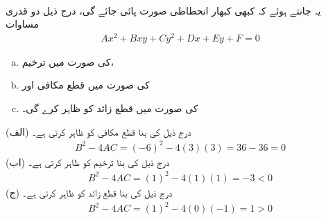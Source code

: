 \\
یہ جانتے ہوئے کہ کبھی کبھار انحطاطی صورت پائی جائے گی، درج ذیل دو قدری مساوات 
\begin{align*}
Ax^2+Bxy+Cy^2+Dx+Ey+F=0
\end{align*}
\begin{enumerate}[a.]
\item
{} کی صورت میں ترخیم،
\item
{} کی صورت میں قطع مکافی اور
\item
{} کی صورت میں قطع زائد کو ظاہر کرے گی۔
\end{enumerate}

(الف) درج ذیل کی بنا  قطع مکافی کو ظاہر کرتی ہے۔
\begin{align*}
B^2-4AC=(-6)^2-4(3)(3)=36-36=0
\end{align*}
(اب) درج ذیل کی بنا  ترخیم کو ظاہر کرتی ہے۔
\begin{align*}
B^2-4AC=(1)^2-4(1)(1)=-3<0
\end{align*}
(ج) درج ذیل کی بنا  قطع زائد کو ظاہر کرتی ہے۔
\begin{align*}
B^2-4AC=(1)^2-4(0)(-1)=1>0
\end{align*}

